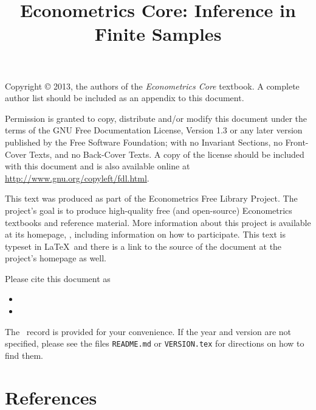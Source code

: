\documentclass{tex/tufte-handout}
\title{Econometrics Core: Inference in Finite Samples}
\begin{document}
\maketitle

\bigskip\noindent%
Copyright © 2013, the authors of the \textit{Econometrics Core}
textbook.  A complete author list should be included as an appendix to
this document.

Permission is granted to copy, distribute and/or modify this document
under the terms of the GNU Free Documentation License, Version 1.3 or
any later version published by the Free Software Foundation; with no
Invariant Sections, no Front-Cover Texts, and no Back-Cover Texts.  A
copy of the license should be included with this document and is also
available online at \url{http://www.gnu.org/copyleft/fdl.html}.

This text was produced as part of the Econometrics Free Library
Project.  The project's goal is to produce high-quality free (and
open-source) Econometrics textbooks and reference material.  More
information about this project is available at its homepage,
\homepage, including information on how
to participate.  This text is typeset in \LaTeX\ and there is a link
to the source of the document at the project's homepage as well.

Please cite this document as
\begin{itemize}
\item[] 
\item[] 
\end{itemize}
The \BibTeX\ record is provided for your convenience.
If the year and version are not specified, please see the files
\texttt{README.md} or \texttt{VERSION.tex} for directions on how to
find them.

\tableofcontents










\part*{References}%

\end{document}
